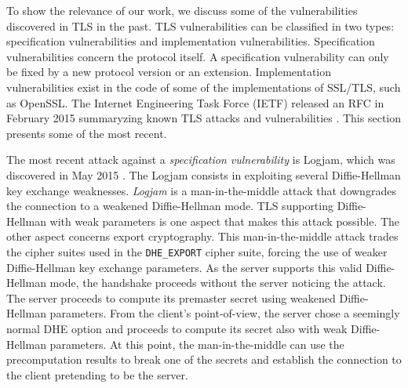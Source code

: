 \documentclass{sig-alternate-05-2015}
\newcommand{\suite}[1]{\texttt{{\footnotesize #1}}}
\begin{document}
To show the relevance of our work, we discuss some of the vulnerabilities discovered in TLS in the past.
TLS vulnerabilities can be classified in two types: specification vulnerabilities and implementation vulnerabilities. Specification vulnerabilities concern the protocol itself. A specification vulnerability can only be fixed by a new protocol version or an extension. 
Implementation vulnerabilities exist in the code of some of the  implementations of SSL/TLS, such as OpenSSL.
The Internet Engineering Task Force (IETF) released an RFC in February 2015 summaryzing known TLS attacks and vulnerabilities  \cite{RFC7457}. This section  presents some of the most recent.

The most recent attack against a \emph{specification vulnerability} is Logjam, which was discovered in May 2015 \cite{Adrian2015}. The Logjam  consists in exploiting several Diffie-Hellman key exchange weaknesses.
\textit{Logjam} is a man-in-the-middle attack that downgrades the connection to a weakened Diffie-Hellman mode. TLS supporting Diffie-Hellman with weak parameters is one aspect that makes this attack possible. The other aspect concerns  export cryptography. 
%
%
This man-in-the-middle attack trades the cipher suites used in the \suite{DHE\_EXPORT} cipher suite, forcing the use of weaker Diffie-Hellman key exchange parameters. As the server supports this valid Diffie-Hellman mode, the handshake proceeds without the server noticing the attack. The server proceeds to compute its premaster secret using weakened Diffie-Hellman parameters. From the client's point-of-view, the server chose a seemingly normal DHE option and proceeds to compute its secret also with weak Diffie-Hellman parameters. At this point, the man-in-the-middle can use the precomputation results to break one of the secrets and establish the connection to the client pretending to be the server. 
\end{document}
